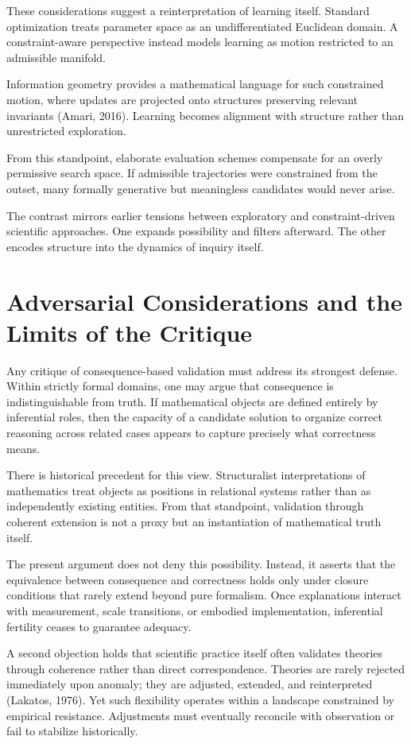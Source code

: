 \documentclass[11pt]{article}
\begin{document}
These considerations suggest a reinterpretation of learning itself. Standard optimization treats parameter space as an undifferentiated Euclidean domain. A constraint-aware perspective instead models learning as motion restricted to an admissible manifold.

Information geometry provides a mathematical language for such constrained motion, where updates are projected onto structures preserving relevant invariants (Amari, 2016). Learning becomes alignment with structure rather than unrestricted exploration.

From this standpoint, elaborate evaluation schemes compensate for an overly permissive search space. If admissible trajectories were constrained from the outset, many formally generative but meaningless candidates would never arise.

The contrast mirrors earlier tensions between exploratory and constraint-driven scientific approaches. One expands possibility and filters afterward. The other encodes structure into the dynamics of inquiry itself.

\section{Adversarial Considerations and the Limits of the Critique}

Any critique of consequence-based validation must address its strongest defense. Within strictly formal domains, one may argue that consequence is indistinguishable from truth. If mathematical objects are defined entirely by inferential roles, then the capacity of a candidate solution to organize correct reasoning across related cases appears to capture precisely what correctness means.

There is historical precedent for this view. Structuralist interpretations of mathematics treat objects as positions in relational systems rather than as independently existing entities. From that standpoint, validation through coherent extension is not a proxy but an instantiation of mathematical truth itself.

The present argument does not deny this possibility. Instead, it asserts that the equivalence between consequence and correctness holds only under closure conditions that rarely extend beyond pure formalism. Once explanations interact with measurement, scale transitions, or embodied implementation, inferential fertility ceases to guarantee adequacy.

A second objection holds that scientific practice itself often validates theories through coherence rather than direct correspondence. Theories are rarely rejected immediately upon anomaly; they are adjusted, extended, and reinterpreted (Lakatos, 1976). Yet such flexibility operates within a landscape constrained by empirical resistance. Adjustments must eventually reconcile with observation or fail to stabilize historically.
\end{document}

